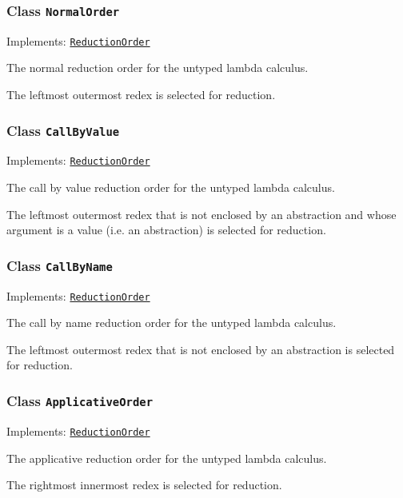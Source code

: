 \subsubsection{Class \texttt{NormalOrder}}
\label{type:edu.kit.wavelength.client.model.reduction.NormalOrder}
Implements: \texttt{\hyperref[type:edu.kit.wavelength.client.model.reduction.ReductionOrder]{ReductionOrder}}

The normal reduction order for the untyped lambda calculus.
 
 The leftmost outermost redex is selected for reduction.

\subsubsection{Class \texttt{CallByValue}}
\label{type:edu.kit.wavelength.client.model.reduction.CallByValue}
Implements: \texttt{\hyperref[type:edu.kit.wavelength.client.model.reduction.ReductionOrder]{ReductionOrder}}

The call by value reduction order for the untyped lambda calculus.
 
 The leftmost outermost redex that is not enclosed by an abstraction and whose
 argument is a value (i.e. an abstraction) is selected for reduction.

\subsubsection{Class \texttt{CallByName}}
\label{type:edu.kit.wavelength.client.model.reduction.CallByName}
Implements: \texttt{\hyperref[type:edu.kit.wavelength.client.model.reduction.ReductionOrder]{ReductionOrder}}

The call by name reduction order for the untyped lambda calculus.
 
 The leftmost outermost redex that is not enclosed by an abstraction is
 selected for reduction.

\subsubsection{Class \texttt{ApplicativeOrder}}
\label{type:edu.kit.wavelength.client.model.reduction.ApplicativeOrder}
Implements: \texttt{\hyperref[type:edu.kit.wavelength.client.model.reduction.ReductionOrder]{ReductionOrder}}

The applicative reduction order for the untyped lambda calculus.

 The rightmost innermost redex is selected for reduction.

